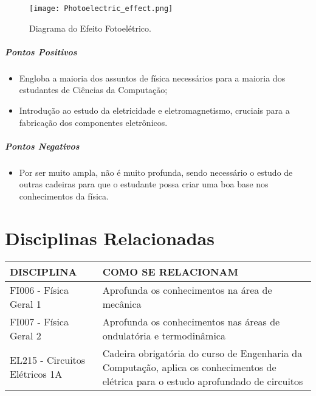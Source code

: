 \documentclass[a4paper]{article}
\begin{document}
\begin{figure}[h]
\centering
\texttt{[image: Photoelectric\_effect.png]}
\caption{\label{fig:EfeitoFotoeletrico}Diagrama do Efeito Fotoelétrico.\cite{photoelectric_effect:WC}}
\end{figure}

\subparagraph{Pontos Positivos}
\begin{itemize}
\item Engloba a maioria dos assuntos de física necessários para a maioria dos estudantes de Ciências da Computação;
\item Introdução ao estudo da eletricidade e eletromagnetismo, cruciais para a fabricação dos componentes eletrônicos.
\end{itemize}

\subparagraph{Pontos Negativos}
\begin{itemize}
\item Por ser muito ampla, não é muito profunda, sendo necessário o estudo de outras cadeiras para que o estudante possa criar uma boa base nos conhecimentos da física. 
\end{itemize}

\section{Disciplinas Relacionadas}

\begin{table}[H]
\centering
\label{my-label}
\begin{tabular}{|l|L{6cm}|}
\hline
DISCIPLINA & COMO SE RELACIONAM \\ \hline
FI006 - Física Geral 1 & Aprofunda os conhecimentos na área de mecânica \\ \hline
FI007 - Física Geral 2 & Aprofunda os conhecimentos nas áreas de ondulatória e termodinâmica \\ \hline
EL215 - Circuitos Elétricos 1A & Cadeira obrigatória do curso de Engenharia da Computação, aplica os conhecimentos de elétrica para o estudo aprofundado de circuitos
\\ \hline
\end{tabular}
\end{table}



\end{document}
